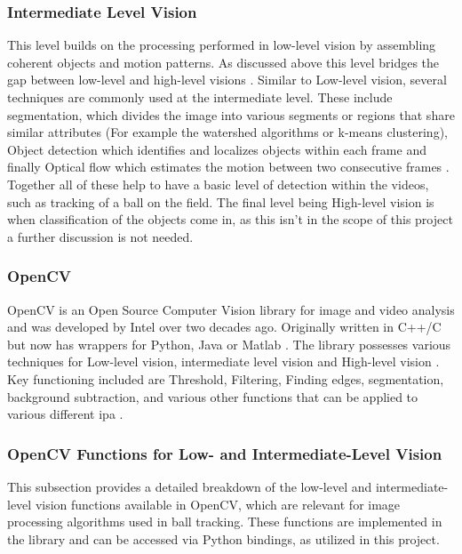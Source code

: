 \documentclass[12pt,a4paper]{article}
\begin{document}
\subsubsection{Intermediate Level Vision}
This level builds on the processing performed in low-level vision by assembling coherent objects and motion patterns. As discussed above this level bridges the gap between low-level and high-level visions \parencite{metaeye}. Similar to Low-level vision, several techniques are commonly used at the intermediate level. These include segmentation, which divides the image into various segments or regions that share similar attributes (For example the watershed algorithms or k-means clustering), Object detection which identifies and localizes objects within each frame and finally Optical flow which estimates the motion between two consecutive frames \parencite{metaeye}. Together all of these help to have a basic level of detection within the videos, such as tracking of a ball on the field. The final level being High-level vision is when classification of the objects come in, as this isn't in the scope of this project a further discussion is not needed.

\subsubsection{OpenCV}
OpenCV is an Open Source Computer Vision library for image and video analysis and was developed by Intel over two decades ago. Originally written in C++/C but now has wrappers for Python, Java or Matlab \parencite{culjak2012opencv}. The library possesses various techniques for Low-level vision, intermediate level vision and High-level vision \parencite{mohamad2015opencv}. Key functioning included are Threshold, Filtering, Finding edges, segmentation, background subtraction, and various other functions that can be applied to various different \acs{ipa} \parencite{marengoni2011opencv}. 

\subsubsection{OpenCV Functions for Low- and Intermediate-Level Vision}
This subsection provides a detailed breakdown of the low-level and intermediate-level vision functions available in OpenCV, which are relevant for image processing algorithms used in ball tracking. These functions are implemented in the library and can be accessed via Python bindings, as utilized in this project.
\end{document}
